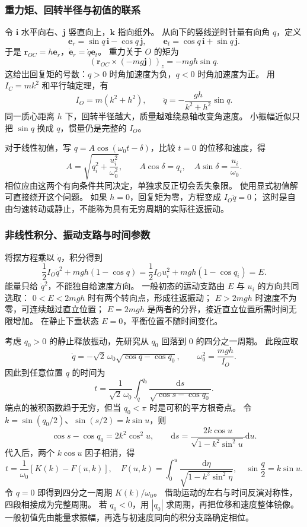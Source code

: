 \documentclass[UTF8,zihao=-4,fontset=fandol,a4paper]{ctexart}
\newcommand{\vect}[1]{\bm{#1}}
\newcommand{\dd}{\mathrm d}
\begin{document}
\subsubsection*{重力矩、回转半径与初值的联系}
令 $\vect i$ 水平向右、$\vect j$ 竖直向上，$\vect k$ 指向纸外。
从向下的竖线逆时针量有向角 $q$，定义
\[
\vect e_r=\sin q\,\vect i-\cos q\,\vect j,
\qquad
\vect e_t=\cos q\,\vect i+\sin q\,\vect j.
\]
于是 $\vect r_{OC}=h\vect e_r$，$\dot{\vect e}_r=\dot q\vect e_t$。
重力关于 $O$ 的矩为
\[
(\vect r_{OC}\times(-mg\vect j))_z=-mgh\sin q.
\]
这给出回复矩的号数：$q>0$ 时角加速度为负，$q<0$ 时角加速度为正。
用 $I_C=mk^2$ 和平行轴定理，有
\[
I_O=m(k^2+h^2),\qquad
\ddot q=-\frac{gh}{k^2+h^2}\sin q.
\]
同一质心距离 $h$ 下，回转半径越大，质量越难绕悬轴改变角速度。
小振幅近似只把 $\sin q$ 换成 $q$，惯量仍是完整的 $I_O$。

对于线性初值，写 $q=A\cos(\omega_0t-\delta)$，比较 $t=0$ 的位移和速度，得
\[
A=\sqrt{q_i^2+\frac{u_i^2}{\omega_0^2}},\qquad
A\cos\delta=q_i,\quad A\sin\delta=\frac{u_i}{\omega_0}.
\]
相位应由这两个有向条件共同决定，单独求反正切会丢失象限。
使用显式初值解可直接绕开这个问题。
如果 $h=0$，回复矩为零，方程变成 $I_O\ddot q=0$；
这时是自由匀速转动或静止，不能称为具有无穷周期的实际往返振动。

\subsubsection*{非线性积分、振动支路与时间参数}
将摆方程乘以 $\dot q$，积分得到
\[
\frac12I_O\dot q^2+mgh(1-\cos q)
=\frac12I_Ou_i^2+mgh(1-\cos q_i)=E.
\]
能量只给 $\dot q^2$，不能独自给速度方向。
一般初态的运动支路由 $E$ 与 $u_i$ 的方向共同选取：
$0<E<2mgh$ 时有两个转向点，形成往返振动；
$E>2mgh$ 时速度不为零，可连续越过直立位置；
$E=2mgh$ 是两者的分界，接近直立位置所需时间无限增加。
在静止下垂状态 $E=0$，平衡位置不随时间变化。

考虑 $q_0>0$ 的静止释放振动，先研究从 $q_0$ 回落到 $0$ 的四分之一周期。
此段应取
\[
\dot q=-\sqrt{2}\,\omega_0\sqrt{\cos q-\cos q_0},\qquad
\omega_0^2=\frac{mgh}{I_O}.
\]
因此到任意位置 $q$ 的时间为
\[
t=\frac1{\sqrt2\,\omega_0}
\int_q^{q_0}\frac{\dd s}{\sqrt{\cos s-\cos q_0}}.
\]
端点的被积函数趋于无穷，但当 $q_0<\pi$ 时是可积的平方根奇点。
令 $k=\sin(q_0/2)$、$\sin(s/2)=k\sin u$，则
\[
\cos s-\cos q_0=2k^2\cos^2u,\qquad
\dd s=\frac{2k\cos u}{\sqrt{1-k^2\sin^2u}}\dd u.
\]
代入后，两个 $k\cos u$ 因子相消，得
\[
t=\frac1{\omega_0}\left[K(k)-F(u,k)\right],
\quad F(u,k)=\int_0^u\frac{\dd\eta}{\sqrt{1-k^2\sin^2\eta}},
\quad \sin\frac q2=k\sin u.
\]
令 $q=0$ 即得到四分之一周期 $K(k)/\omega_0$。
借助运动的左右与时间反演对称性，四段相接成为完整周期。
若 $q_0<0$，用 $|q_0|$ 求周期，再把位移和速度整体镜像。
一般初值先由能量求振幅，再选与初速度同向的积分支路确定相位。
\end{document}
